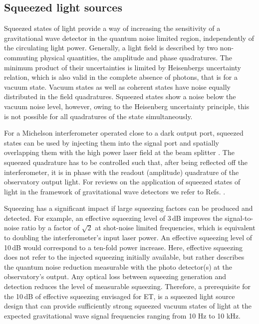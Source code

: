 \label{sec:Squeezers}

\subsection{Squeezed light sources}


Squeezed states of light \cite{Yuen76,Walls1983,Breitenbach97} provide a way of increasing the sensitivity of a gravitational wave detector in the quantum noise limited region, independently of the circulating light power. Generally, a light field is described by two non-commuting physical quantities, the amplitude and phase quadratures. The minimum product of their uncertainties is limited by Heisenbergs uncertainty relation, which is also valid in the complete absence of photons, that is for a vacuum state. Vacuum states as well as coherent states have noise equally distributed in the field quadratures. Squeezed states show a noise below the vacuum noise level, however, owing to the Heisenberg uncertainty principle, this is not possible for all quadratures of the state simultaneously.  

For a Michelson interferometer operated close to a dark output port, squeezed states can be used by injecting them into the signal port and spatially overlapping them with the high power laser field at the beam splitter \cite{1981_PRD.23.1693_Caves}. The squeezed quadrature has to be controlled such that, after being reflected off the interferometer, it is in phase with the readout (amplitude) quadrature of the observatory output light. For reviews on the application of squeezed states of light in the framework of gravitational wave detectors we refer to Refs. \cite{Schnabel2010,Schnabel2017,Barsotti2018}.

Squeezing has a significant impact if large squeezing factors can be produced and detected. For example, an effective squeezing level of 3\,dB improves the signal-to-noise ratio by a factor of $\sqrt{2}$ at shot-noise limited frequencies, which is equivalent to doubling the interferometer's input laser power. An effective squeezing level of 10\,dB would correspond to a ten-fold power increase. Here, effective squeezing does not refer to the injected squeezing initially available, but rather describes the quantum noise reduction measurable with the photo detector(s) at the observatory's output.  
%
Any optical loss between squeezing generation and detection reduces the level of measurable squeezing. Therefore, a prerequisite for the 10\,dB of effective squeezing envisaged for ET, is a squeezed light source design that can provide sufficiently strong squeezed vacuum states of light at the expected gravitational wave signal frequencies ranging from 10 Hz to 10 kHz. 

